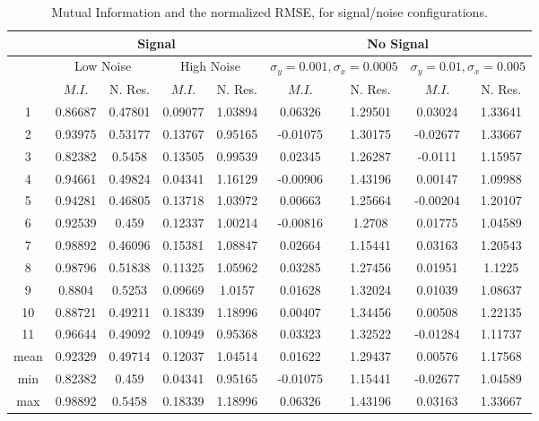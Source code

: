 \begin{table}[t]
\centering
\begin{tabular}{|c | c | c | c | c | c | c | c | c |}
\hline
& \multicolumn{4}{|c|}{Signal} & \multicolumn{4}{|c|}{No Signal}\\
\hline
& \multicolumn{2}{|c|}{Low Noise} & \multicolumn{2}{|c|}{High Noise}
& \multicolumn{2}{|c|}{$\sigma_y = 0.001, \sigma_x = 0.0005$}
& \multicolumn{2}{|c|}{$\sigma_y = 0.01, \sigma_x = 0.005$}\\
\hline
& $M.I.$ & N. Res. &
  $M.I.$ & N. Res. &
  $M.I.$ & N. Res. &
  $M.I.$ & N. Res. \\
\hline
\hline
1 &   0.86687  &0.47801 &  0.09077  &1.03894 &  0.06326  &  1.29501 & 0.03024  &1.33641 \\
2 &   0.93975  &0.53177 &  0.13767  &0.95165 &  -0.01075  & 1.30175 & -0.02677 &1.33667 \\
3 &   0.82382  &0.5458  &  0.13505  &0.99539 &  0.02345  &  1.26287 & -0.0111  &1.15957 \\
4 &   0.94661  &0.49824 &  0.04341  &1.16129 &  -0.00906  & 1.43196 & 0.00147  &1.09988 \\
5 &   0.94281  &0.46805 &  0.13718  &1.03972 &  0.00663  &  1.25664 & -0.00204 &1.20107 \\
6 &   0.92539  &0.459   &  0.12337  &1.00214 &  -0.00816  & 1.2708 &  0.01775  &1.04589 \\
7 &   0.98892  &0.46096 &  0.15381  &1.08847 &  0.02664  &  1.15441 & 0.03163  &1.20543 \\
8 &   0.98796  &0.51838 &  0.11325  &1.05962 &  0.03285  &  1.27456 & 0.01951  &1.1225 \\
9 &   0.8804   &0.5253  &  0.09669  &1.0157  &  0.01628  &  1.32024 & 0.01039  &1.08637 \\
10 &  0.88721   &0.49211 & 0.18339  &1.18996 &  0.00407  &  1.34456 & 0.00508  &1.22135 \\
11 &  0.96644   &0.49092 & 0.10949  &0.95368 &  0.03323  &  1.32522 & -0.01284 &1.11737 \\
\hline
mean &0.92329  &0.49714 & 0.12037   &1.04514 &  0.01622  &  1.29437 & 0.00576  &1.17568 \\
\hline
min &  0.82382  &0.459   &  0.04341  &0.95165 & -0.01075  & 1.15441 & -0.02677 &1.04589 \\
\hline
max &  0.98892  &0.5458  & 0.18339   &1.18996 & 0.06326  &  1.43196 & 0.03163  &1.33667 \\
\hline
\end{tabular}
\caption{Mutual Information and the normalized \ac{RMSE},
    for signal/noise configurations.}
\label{tab:SingleVoxelActivationComparison}
\end{table}


